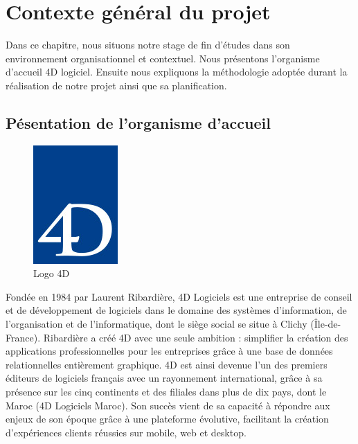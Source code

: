 \chapter{Contexte général du projet}
\label{chap:Contexte général du projet}



Dans ce chapitre, nous situons notre stage de fin d’études dans son environnement organisationnel et contextuel. Nous présentons l’organisme d’accueil 4D logiciel. Ensuite nous expliquons la méthodologie adoptée durant la réalisation de notre projet ainsi que sa planification.

\newpage


\section{Pésentation de l’organisme d’accueil}

\begin{figure}[h]
    \centering
    \includegraphics[scale=0.5]{Logos/Logo-4D.jpg} %
    \caption{Logo 4D }
    \label{fig:Logo4D}
\end{figure}

Fondée en 1984 par Laurent Ribardière, 4D Logiciels est une entreprise de conseil et de développement de logiciels dans le domaine des systèmes d’information, de l’organisation et de l’informatique, dont le siège social se situe à Clichy (Île-de-France). Ribardière a créé 4D avec une seule ambition : simplifier la création des applications professionnelles pour les entreprises grâce à une base de données relationnelles entièrement graphique. 4D est ainsi devenue l’un des premiers éditeurs de logiciels français avec un rayonnement international, grâce à sa présence sur les cinq continents et des filiales dans plus de dix pays, dont le Maroc (4D Logiciels Maroc). Son succès vient de sa capacité à répondre aux enjeux de son époque grâce à une plateforme évolutive, facilitant la création d’expériences clients réussies sur mobile, web et desktop. \cite{ref1}

